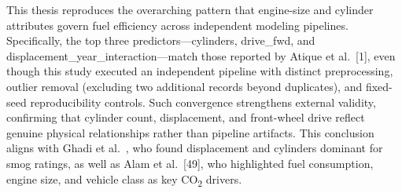 \begin{table}[H]
\centering
\setlength{\arrayrulewidth}{2pt} %
\renewcommand{\arraystretch}{1.2}

\caption{Comparative summary against prior literature.}
\label{tab:comparative_summary}
\end{table}

This thesis reproduces the overarching pattern that engine-size and cylinder attributes govern fuel efficiency across independent modeling pipelines. Specifically, the top three predictors---cylinders, drive\_fwd, and displacement\_year\_interaction---match those reported by Atique et al.~[1], even though this study executed an independent pipeline with distinct preprocessing, outlier removal (excluding two additional records beyond duplicates), and fixed-seed reproducibility controls. Such convergence strengthens external validity, confirming that cylinder count, displacement, and front-wheel drive reflect genuine physical relationships rather than pipeline artifacts. This conclusion aligns with Ghadi et al.~\cite{ghadi2025explainable}, who found displacement and cylinders dominant for smog ratings, as well as Alam et al.~[49], who highlighted fuel consumption, engine size, and vehicle class as key CO\textsubscript{2} drivers.

